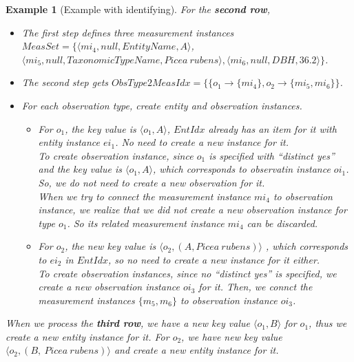 \documentclass[10pt]{article}
\newtheorem{example}{Example}[section]
\begin{document}
\begin{example} [Example with identifying]
For the {\bf second row}, 
\begin{itemize} 
\item The first step defines three measurement instances $MeasSet=\{\langle mi_4, null, EntityName, A\rangle$, \\
$\langle mi_5, null,TaxonomicTypeName, Picea~rubens\rangle, \langle mi_6, null, DBH, 36.2\rangle\}$.
\item The second step gets $ObsType2MeasIdx = \{\{o_1\rightarrow \{mi_4\}, o_2 \rightarrow \{mi_5, mi_6\}\}$.
\item For each observation type, create entity and observation instances.
\begin{itemize}
\item For $o_1$, the key value is $\langle o_1, A\rangle$, $EntIdx$ already has an item for it with entity instance $ei_1$. No need to create a new instance for it. \\
To create observation instance, since $o_1$ is specified with ``{\em distinct yes}'' and the key value is $\langle o_1,A\rangle$, 
which corresponds to observatin instance $oi_1$. So, we do not need to create a new observation for it.\\
When we try to connect the measurement instance $mi_4$ to observation instance,  we realize that we did not create a new observation instance for type $o_1$. 
So its related measurement instance $mi_4$ can be discarded. 
\item For $o_2$, the new key value is $\langle o_2, (A, Picea~rubens)\rangle$ , which corresponds to $ei_2$ in $EntIdx$, so no need to create a new instance for it either. \\
To create observation instances, since no ``{\em distinct yes}'' is specified, we create a new observation instance $oi_3$ for it.
Then, we connct the measurement instances $\{m_5, m_6\}$ to observation instance $oi_3$.
\end{itemize}
\end{itemize}

When we process the {\bf third row}, we have a new key value $\langle o_1, B\rangle$ for $o_1$, thus we create a new entity instance for it.
For $o_2$, we have new key value $\langle o_2, (B,~Picea~rubens)\rangle$ and create a new entity instance for it.

\end{example}
\end{document}
